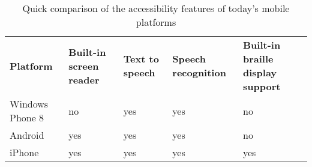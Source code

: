 \begin{table}[htbp]
  \centering
  \caption{Quick comparison of the accessibility features of today's mobile platforms}
  \label{tab:accbilityComparison}
 \renewcommand{\arraystretch}{1.2}
    \begin{tabularx}{\textwidth}{X|X|X|X|X}
    \rowcolor{mygray}
    \textbf{Platform} & \textbf{Built-in screen reader} & \textbf{Text to speech} & \textbf{Speech recognition} & \textbf{Built-in braille display support}\\
    Windows Phone 8 & no\footnotemark[1] & yes & yes & no \\ \hline
    Android & yes & yes & yes & no\\ \hline
    iPhone & yes & yes & yes & yes \\
    \end{tabularx}%
\end{table}%

